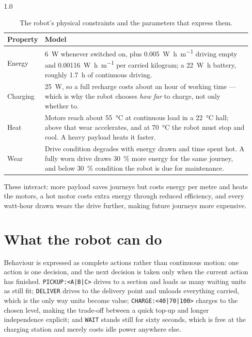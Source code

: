 \begin{table}[H]
    \centering
    \begin{spacing}{1.0}
    \caption{The robot's physical constraints and the parameters that express them.}
    \label{tab:robot}
    \small
    \begin{tabularx}{\textwidth}{lX}
        \toprule
        Property & Model\\
        \midrule
        Energy & \SI{6}{\watt} whenever switched on, plus \SI{0.005}{\watt\hour\per\metre} driving
                 empty and \SI{0.00116}{\watt\hour\per\metre} per carried kilogram; a
                 \SI{22}{\watt\hour} battery, roughly \SI{1.7}{\hour} of continuous driving.\\
        Charging & \SI{25}{\watt}, so a full recharge costs about an hour of working time --- which
                 is why the robot chooses \emph{how far} to charge, not only whether to.\\
        Heat & Motors reach about \SI{55}{\degreeCelsius} at continuous load in a
                 \SI{22}{\degreeCelsius} hall; above that wear accelerates, and at
                 \SI{70}{\degreeCelsius} the robot must stop and cool. A heavy payload heats it
                 faster.\\
        Wear & Drive condition degrades with energy drawn and time spent hot. A fully worn drive
                 draws \SI{30}{\percent} more energy for the same journey, and below
                 \SI{30}{\percent} condition the robot is due for maintenance.\\
        \bottomrule
    \end{tabularx}
    \end{spacing}
\end{table}

These interact: more payload saves journeys but costs energy per metre and heats the motors, a hot
motor costs extra energy through reduced efficiency, and every watt-hour drawn wears the drive
further, making future journeys more expensive.

\section{What the robot can do}
\label{sec:actions}

Behaviour is expressed as complete actions rather than continuous motion: one action is one
decision, and the next decision is taken only when the current action has finished.
\texttt{PICKUP:<A|B|C>} drives to a section and loads as many waiting units as still fit;
\texttt{DELIVER} drives to the delivery point and unloads everything carried, which is the only way
units become value; \texttt{CHARGE:<40|70|100>} charges to the chosen level, making the trade-off
between a quick top-up and longer independence explicit; and \texttt{WAIT} stands still for sixty
seconds, which is free at the charging station and merely costs idle power anywhere else.

